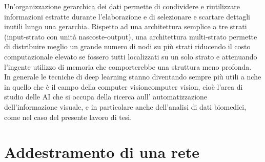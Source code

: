 Un’organizzazione gerarchica dei dati permette di condividere e riutilizzare informazioni
 estratte durante l’elaborazione e di selezionare e scartare dettagli inutili lungo una gerarchia.
  Rispetto ad una architettura semplice a tre strati (input-strato con unità nascoste-output),
   una architettura multi-strato permette di distribuire meglio un grande numero di nodi 
   su più strati riducendo il costo computazionale elevato se fossero tutti localizzati
    su un solo strato e attenuando l’ingente utilizzo di memoria che comporterebbe una 
    struttura meno profonda. \\ 
    In generale le tecniche di deep learning stanno diventando sempre più utili a
    nche in quello che è il campo della computer visioncomputer vision, 
    cioè l'area di studio delle AI che si occupa della ricerca aull' automatizzazione 
    dell'informazione visuale, e in particolare anche dell'analisi di dati biomedici,
     come nel caso del presente lavoro di tesi.



\section{Addestramento di una rete}

